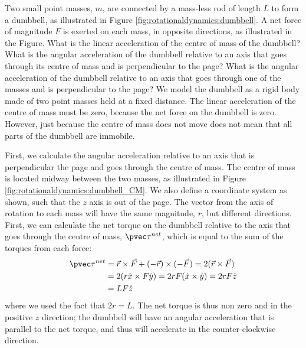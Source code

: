 \begin{example}{ Two small point masses, $m$, are connected by a mass-less rod of length $L$ to form a dumbbell, as illustrated in Figure \ref{fig:rotationaldynamics:dumbbell}. A net force of magnitude $F$ is exerted on each mass, in opposite directions, as illustrated in the Figure. What is the linear acceleration of the centre of mass of the dumbbell? What is the angular acceleration of the dumbbell relative to an axis that goes through its centre of mass and is perpendicular to the page? What is the angular acceleration of the dumbbell relative to an axis that goes through one of the masses and is perpendicular to the page? }
We model the dumbbell as a rigid body made of two point masses held at a fixed distance. The linear acceleration of the centre of mass must be zero, because the net force on the dumbbell is zero. However, just because the centre of mass does not move does not mean that all parts of the dumbbell are immobile.

First, we calculate the angular acceleration relative to an axis that is perpendicular the page and goes through the centre of mass. The centre of mass is located midway between the two masses, as illustrated in Figure \ref{fig:rotationaldynamics:dumbbell_CM}. We also define a coordinate system as shown, such that the $z$ axis is out of the page.
The vector from the axis of rotation to each mass will have the same magnitude, $r$, but different directions. First, we can calculate the net torque on the dumbbell relative to the axis that goes through the centre of mass, $\pvec\tau^{net}$, which is equal to the sum of the torques from each force:
\begin{align*}
\pvec\tau^{net}&= \vec r \times \vec F + (-\vec r) \times (-\vec F) = 2 (\vec r \times \vec F)\\
&=2 (r\hat x \times F\hat y) = 2rF (\hat x \times \hat y)=2rF\hat z\\
&=LF\hat z
\end{align*}
where we used the fact that $2r = L$. The net torque is thus non zero and in the positive $z$ direction; the dumbbell will have an angular acceleration that is parallel to the net torque, and thus will accelerate in the counter-clockwise direction.


\end{example}
